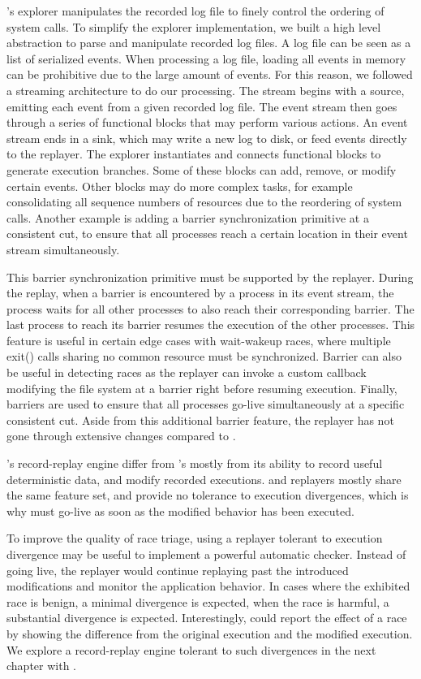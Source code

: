 \racepro's explorer manipulates the recorded log file to finely control the
ordering of system calls. To simplify the explorer implementation, we built a
high level abstraction to parse and manipulate recorded log files. A log file
can be seen as a list of serialized events. When processing a log file,
loading all events in memory can be prohibitive due to the large amount of
events. For this reason, we followed a streaming architecture to do our
processing. The stream begins with a source, emitting each event from a given
recorded log file. The event stream then goes through a series of 
functional blocks that may perform various actions. An event stream ends in a
sink, which may write a new log to disk, or feed events directly to the
replayer. The explorer instantiates and connects functional blocks to generate
execution branches. Some of these blocks can add, remove, or modify certain
events. Other blocks may do more complex tasks, for example consolidating
all sequence numbers of resources due to the reordering of system calls.
Another example is adding a barrier synchronization primitive at a consistent cut,
to ensure that all processes reach a certain location in their event stream
simultaneously.

This barrier synchronization primitive must be supported by the replayer.
During the replay, when a barrier is encountered by a process in its event
stream, the process waits for all other processes to also reach their corresponding barrier.
The last process to reach its barrier resumes the execution of the other
processes. This feature is useful in certain edge cases with wait-wakeup
races, where multiple {\code exit()} calls sharing no common resource must be
synchronized. Barrier can also be useful in detecting \toctou races as the
replayer can invoke a custom callback modifying the file system at a barrier
right before resuming execution. Finally, barriers are used to ensure that all
processes go-live simultaneously at a specific consistent cut.
Aside from this additional barrier feature, the replayer has not gone through
extensive changes compared to \scribe.

\racepro's record-replay engine differ from \scribe's mostly from its
ability to record useful deterministic data, and modify recorded executions.
\racepro and \scribe replayers mostly share the same feature set, and provide no
tolerance to execution divergences, which is why \racepro must go-live as soon
as the modified behavior has been executed.

To improve the quality of race triage, using a replayer tolerant to execution
divergence may be useful to implement a powerful automatic checker.
Instead of going live, the replayer would continue replaying past the introduced
modifications and monitor the application behavior.
In cases where the exhibited race is benign, a minimal divergence is expected,
when the race is harmful, a substantial divergence is expected.
Interestingly, \racepro could report the effect of a race by showing the
difference from the original execution and the modified execution.
We explore a record-replay engine tolerant to such divergences in the next
chapter with \dora.

